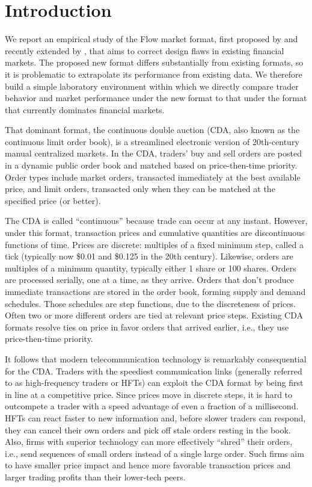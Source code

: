 \documentclass[12pt]{article}
\begin{document}
\section{Introduction} \label{introduction}

We report an empirical study of the Flow market format, first proposed by \cite{Kyle2017} and recently extended by \cite{Budish2023}, that aims to 
correct design flaws in existing financial markets. 
The proposed new format differs substantially from existing formats,
so it is problematic to extrapolate its performance from existing data. 
We therefore build a simple laboratory environment within which we directly compare trader behavior and market performance under the new format to that under the format that currently dominates financial markets.

That dominant format, the continuous double auction (CDA, also known as the continuous limit order book), is a streamlined electronic version of 20th-century manual centralized markets. In the CDA, traders' buy and sell orders are posted in a dynamic public order book and matched based on price-then-time priority. Order types include market orders, transacted immediately at the best available price, and limit orders, transacted only when they can be matched at the specified price (or better). 

The CDA is called “continuous” because trade can occur at any instant. 
However, under this format, transaction prices and cumulative quantities are discontinuous functions of time. 
Prices are discrete: multiples of a fixed minimum step, called a tick (typically now \$0.01 and \$0.125 in the 20th century). 
Likewise, orders are multiples of a minimum quantity,
typically either 1 share or 100 shares. 
Orders are processed serially, one at a time, as they arrive. 
Orders that don't produce immediate transactions are stored in the order book, forming supply and demand schedules. 
Those schedules are step functions, due to the   discreteness of prices. 
Often two or more different orders are tied at relevant price steps.
Existing CDA formats resolve ties on price in favor orders that arrived earlier, i.e., they use price-then-time priority. 

It follows that modern telecommunication technology is remarkably consequential for the CDA. Traders   
with the speediest communication links (generally referred to as  high-frequency traders or HFTs)
can exploit the CDA format by being first in line at a competitive price. Since prices move in discrete steps, it is hard to outcompete a trader with a speed advantage of even a fraction of a millisecond. 
HFTs can react faster to new information and, before slower traders can respond, they can cancel their own orders and pick off stale orders resting in the book. 
Also, firms with superior technology can more effectively ``shred'' their orders, i.e., send sequences of small orders instead of a single large order.
Such firms aim to have smaller price impact and hence more favorable transaction prices and larger trading profits than their lower-tech peers. 
\end{document}
